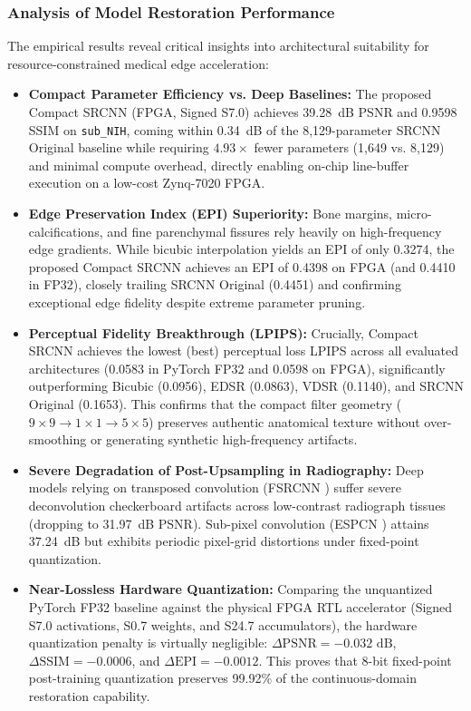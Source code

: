 \documentclass[conference]{IEEEtran}
\begin{document}
\subsubsection{Analysis of Model Restoration Performance}
The empirical results reveal critical insights into architectural suitability for resource-constrained medical edge acceleration:
\begin{itemize}
    \item \textbf{Compact Parameter Efficiency vs. Deep Baselines:} The proposed Compact SRCNN (FPGA, Signed S7.0) achieves 39.28~dB PSNR and 0.9598 SSIM on \texttt{sub\_NIH}, coming within 0.34~dB of the 8,129-parameter SRCNN Original baseline \cite{dong2014learning} while requiring $4.93\times$ fewer parameters (1,649 vs. 8,129) and minimal compute overhead, directly enabling on-chip line-buffer execution on a low-cost Zynq-7020 FPGA.
    \item \textbf{Edge Preservation Index (EPI) Superiority:} Bone margins, micro-calcifications, and fine parenchymal fissures rely heavily on high-frequency edge gradients. While bicubic interpolation yields an EPI of only 0.3274, the proposed Compact SRCNN achieves an EPI of 0.4398 on FPGA (and 0.4410 in FP32), closely trailing SRCNN Original (0.4451) and confirming exceptional edge fidelity despite extreme parameter pruning.
    \item \textbf{Perceptual Fidelity Breakthrough (LPIPS):} Crucially, Compact SRCNN achieves the lowest (best) perceptual loss LPIPS across all evaluated architectures (0.0583 in PyTorch FP32 and 0.0598 on FPGA), significantly outperforming Bicubic (0.0956), EDSR (0.0863), VDSR (0.1140), and SRCNN Original (0.1653). This confirms that the compact filter geometry ($9 \times 9 \rightarrow 1 \times 1 \rightarrow 5 \times 5$) preserves authentic anatomical texture without over-smoothing or generating synthetic high-frequency artifacts.
    \item \textbf{Severe Degradation of Post-Upsampling in Radiography:} Deep models relying on transposed convolution (FSRCNN \cite{dong2016accelerating}) suffer severe deconvolution checkerboard artifacts \cite{odena2016deconvolution} across low-contrast radiograph tissues (dropping to 31.97~dB PSNR). Sub-pixel convolution (ESPCN \cite{shi2016real}) attains 37.24~dB but exhibits periodic pixel-grid distortions under fixed-point quantization.
    \item \textbf{Near-Lossless Hardware Quantization:} Comparing the unquantized PyTorch FP32 baseline against the physical FPGA RTL accelerator (Signed S7.0 activations, S0.7 weights, and S24.7 accumulators), the hardware quantization penalty is virtually negligible: $\Delta\text{PSNR} = -0.032\text{ dB}$, $\Delta\text{SSIM} = -0.0006$, and $\Delta\text{EPI} = -0.0012$. This proves that 8-bit fixed-point post-training quantization preserves 99.92\% of the continuous-domain restoration capability.
\end{itemize}
\end{document}
